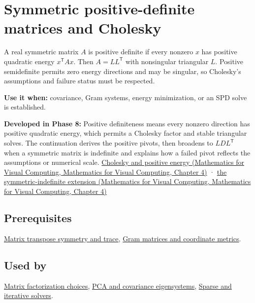 \hypertarget{appendix-50d2ea3c9b26}{}\label{referencestart:appendix-50d2ea3c9b26}
\section{Symmetric positive-definite matrices and Cholesky}\label{appendix-50d2ea3c9b26-symmetric-positive-definite-matrices-and-cholesky}

A real symmetric matrix \(A\) is positive definite if every nonzero \(x\) has positive quadratic energy \(x^\mathsf T A x\). Then \(A=LL^\mathsf T\) with nonsingular triangular \(L\). Positive semidefinite permits zero energy directions and may be singular, so Cholesky's assumptions and failure status must be respected.

\textbf{Use it when:} covariance, Gram systems, energy minimization, or an SPD solve is established.

\textbf{Developed in Phase 8:} Positive definiteness means every nonzero direction has positive quadratic energy, which permits a Cholesky factor and stable triangular solves. The continuation derives the positive pivots, then broadens to \(LDL^\mathsf T\) when a symmetric matrix is indefinite and explains how a failed pivot reflects the assumptions or numerical scale. \href{../02-Mathematics-for-Visual-Computing/main.pdf\#nameddest=01-foundations-i-ch020-positive-definiteness-is-a-structural-promise}{Cholesky and positive energy (Mathematics for Visual Computing, Mathematics for Visual Computing, Chapter 4)} · \href{../02-Mathematics-for-Visual-Computing/main.pdf\#nameddest=01-foundations-i-ch020-ldlt-reaches-symmetric-indefinite-matrices}{the symmetric-indefinite extension (Mathematics for Visual Computing, Mathematics for Visual Computing, Chapter 4)}

\subsection{Prerequisites}\label{appendix-50d2ea3c9b26-prerequisites}

\hyperref[appendix-175ca5ff874d]{Matrix transpose symmetry and trace}, \hyperref[appendix-3b863809f82a]{Gram matrices and coordinate metrics}.

\subsection{Used by}\label{appendix-50d2ea3c9b26-used-by}

\hyperref[appendix-221a483bec2d]{Matrix factorization choices}, \hyperref[appendix-ad175ef3c5bf]{PCA and covariance eigensystems}, \hyperref[appendix-67c87a3d9e94]{Sparse and iterative solvers}.

